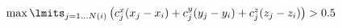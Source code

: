 \documentclass{minimal}
\begin{document}
 $
\max \lmits_{j=1...N(i)}\left( c_j^x (x_j-x_i) + c_j^y (y_j-y_i) + c_j^z (z_j-z_i) \right) > 0.5
 $
 
\end{document}
